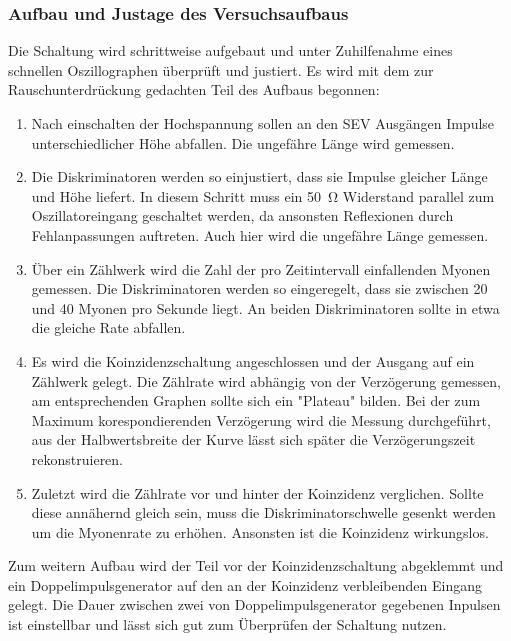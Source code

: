   \subsubsection{Aufbau und Justage des Versuchsaufbaus}
  Die Schaltung wird schrittweise aufgebaut und unter Zuhilfenahme eines schnellen Oszillographen
  überprüft und justiert. Es wird mit dem zur Rauschunterdrückung gedachten
  Teil des Aufbaus begonnen:
  \begin{enumerate}
    \item Nach einschalten der Hochspannung sollen an den SEV Ausgängen Impulse
    unterschiedlicher Höhe abfallen. Die ungefähre Länge wird gemessen.
    \item Die Diskriminatoren werden so einjustiert, dass sie Impulse gleicher Länge und
    Höhe liefert. In diesem Schritt muss ein \SI{50}{\ohm} Widerstand parallel zum
    Oszillatoreingang geschaltet werden, da ansonsten Reflexionen durch Fehlanpassungen
    auftreten. Auch hier wird die ungefähre Länge gemessen.
    \item Über ein Zählwerk wird die Zahl der pro Zeitintervall einfallenden Myonen
    gemessen. Die Diskriminatoren werden so eingeregelt, dass sie zwischen 20 und 40
    Myonen pro Sekunde liegt. An beiden Diskriminatoren sollte in etwa die gleiche
    Rate abfallen.
    \item Es wird die Koinzidenzschaltung angeschlossen und der Ausgang auf ein
    Zählwerk gelegt. Die Zählrate wird abhängig von der Verzögerung gemessen, am
    entsprechenden Graphen sollte sich ein "Plateau" bilden. Bei der zum Maximum
    korespondierenden Verzögerung wird die Messung durchgeführt, aus der Halbwertsbreite
    der Kurve lässt sich später die Verzögerungszeit rekonstruieren.
    \item Zuletzt wird die Zählrate vor und hinter der Koinzidenz verglichen. Sollte
    diese annähernd gleich sein, muss die Diskriminatorschwelle gesenkt werden um die
    Myonenrate zu erhöhen. Ansonsten ist die Koinzidenz wirkungslos.
  \end{enumerate}
  Zum weitern Aufbau wird der Teil vor der Koinzidenzschaltung abgeklemmt und ein
  Doppelimpulsgenerator auf den an der Koinzidenz verbleibenden Eingang gelegt.
  Die Dauer zwischen zwei von Doppelimpulsgenerator gegebenen Inpulsen ist einstellbar
  und lässt sich gut zum Überprüfen der Schaltung nutzen.
